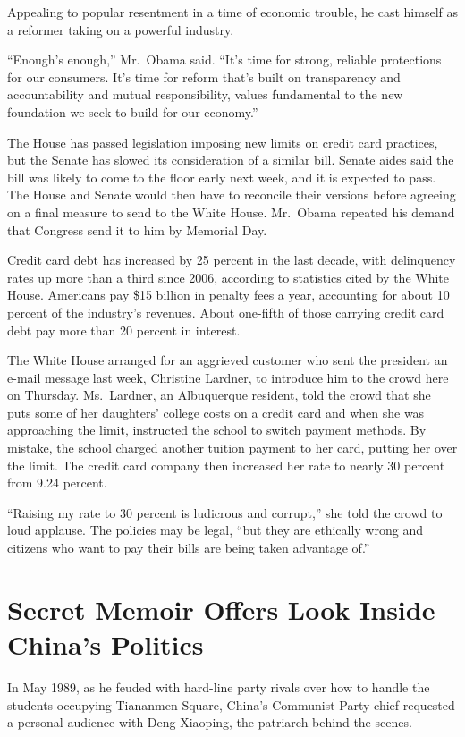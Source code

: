 \documentclass[12pt,a4paper,onecolumn]{article}
\begin{document}
Appealing to popular resentment in a time of economic trouble, he cast himself as a reformer taking
on a powerful industry.

``Enough's enough,'' Mr.~Obama said. ``It's time for strong, reliable protections for our consumers.
It's time for reform that's built on transparency and accountability and mutual responsibility,
values fundamental to the new foundation we seek to build for our economy.''

The House has passed legislation imposing new limits on credit card practices, but the Senate has
slowed its consideration of a similar bill. Senate aides said the bill was likely to come to the
floor early next week, and it is expected to pass. The House and Senate would then have to reconcile
their versions before agreeing on a final measure to send to the White House. Mr.~Obama repeated his
demand that Congress send it to him by Memorial Day.

Credit card debt has increased by 25 percent in the last decade, with delinquency rates up more than
a third since 2006, according to statistics cited by the White House. Americans pay \$15 billion in
penalty fees a year, accounting for about 10 percent of the industry's revenues. About one-fifth of
those carrying credit card debt pay more than 20 percent in interest.

The White House arranged for an aggrieved customer who sent the president an e-mail message last
week, Christine Lardner, to introduce him to the crowd here on Thursday. Ms.~Lardner, an Albuquerque
resident, told the crowd that she puts some of her daughters' college costs on a credit card and
when she was approaching the limit, instructed the school to switch payment methods. By mistake, the
school charged another tuition payment to her card, putting her over the limit. The credit card
company then increased her rate to nearly 30 percent from 9.24 percent.

``Raising my rate to 30 percent is ludicrous and corrupt,'' she told the crowd to loud applause. The
policies may be legal, ``but they are ethically wrong and citizens who want to pay their bills are
being taken advantage of.''

\section{Secret Memoir Offers Look Inside China's Politics}

In May 1989, as he feuded with hard-line party rivals over how to handle the students occupying
Tiananmen Square, China's Communist Party chief requested a personal audience with Deng Xiaoping,
the patriarch behind the scenes.
\end{document}
